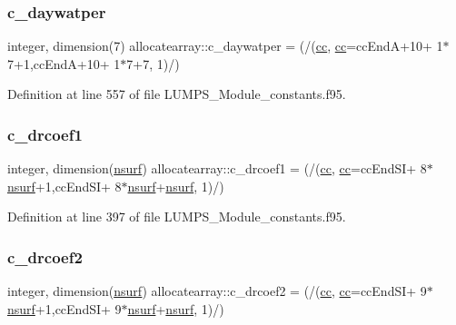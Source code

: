 \subsubsection{\texorpdfstring{c\+\_\+daywatper}{c\_daywatper}}
{\footnotesize\ttfamily integer, dimension(7) allocatearray\+::c\+\_\+daywatper = (/(\hyperlink{namespaceallocatearray_ac863c81704eb507dee10f5e10741e10c}{cc}, \hyperlink{namespaceallocatearray_ac863c81704eb507dee10f5e10741e10c}{cc}=cc\+EndA+10+ 1$\ast$7+1,cc\+EndA+10+ 1$\ast$7+7, 1)/)}



Definition at line 557 of file L\+U\+M\+P\+S\+\_\+\+Module\+\_\+constants.\+f95.

\mbox{\label{namespaceallocatearray_afb48307997ff358fb5efa3ed4bafa42e}} 
\subsubsection{\texorpdfstring{c\+\_\+drcoef1}{c\_drcoef1}}
{\footnotesize\ttfamily integer, dimension(\hyperlink{namespaceallocatearray_acd22f92a06f7e9a2a91426b3dc99fdb0}{nsurf}) allocatearray\+::c\+\_\+drcoef1 = (/(\hyperlink{namespaceallocatearray_ac863c81704eb507dee10f5e10741e10c}{cc}, \hyperlink{namespaceallocatearray_ac863c81704eb507dee10f5e10741e10c}{cc}=cc\+End\+SI+ 8$\ast$\hyperlink{namespaceallocatearray_acd22f92a06f7e9a2a91426b3dc99fdb0}{nsurf}+1,cc\+End\+SI+ 8$\ast$\hyperlink{namespaceallocatearray_acd22f92a06f7e9a2a91426b3dc99fdb0}{nsurf}+\hyperlink{namespaceallocatearray_acd22f92a06f7e9a2a91426b3dc99fdb0}{nsurf}, 1)/)}



Definition at line 397 of file L\+U\+M\+P\+S\+\_\+\+Module\+\_\+constants.\+f95.

\mbox{\label{namespaceallocatearray_a46a4f5cd68febccee03e1360787b9e78}} 
\subsubsection{\texorpdfstring{c\+\_\+drcoef2}{c\_drcoef2}}
{\footnotesize\ttfamily integer, dimension(\hyperlink{namespaceallocatearray_acd22f92a06f7e9a2a91426b3dc99fdb0}{nsurf}) allocatearray\+::c\+\_\+drcoef2 = (/(\hyperlink{namespaceallocatearray_ac863c81704eb507dee10f5e10741e10c}{cc}, \hyperlink{namespaceallocatearray_ac863c81704eb507dee10f5e10741e10c}{cc}=cc\+End\+SI+ 9$\ast$\hyperlink{namespaceallocatearray_acd22f92a06f7e9a2a91426b3dc99fdb0}{nsurf}+1,cc\+End\+SI+ 9$\ast$\hyperlink{namespaceallocatearray_acd22f92a06f7e9a2a91426b3dc99fdb0}{nsurf}+\hyperlink{namespaceallocatearray_acd22f92a06f7e9a2a91426b3dc99fdb0}{nsurf}, 1)/)}



